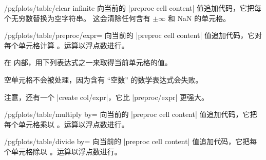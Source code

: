 \documentclass[a4paper,doc2]{ltxdoc}
\begin{document}
\begin{stylekey}{/pgfplots/table/clear infinite}
    向当前的 |preproc cell content| 值追加代码，它把每个无穷数替换为空字符串。
    这会清除任何含有 $\pm \infty$ 和 NaN 的单元格。
\end{stylekey}

\begin{stylekey}{/pgfplots/table/preproc/expr=}
    向当前的 |preproc cell content| 值追加代码，它对每个单元格计算
    。运算以浮点数进行。

    在  内部，用下列表达式之一来取得当前单元格的值。
\begin{codeexample}[]
\end{codeexample}

    空单元格不会被处理，因为含有 ``空数'' 的数学表达式会失败。

    注意，还有一个 |create col/expr|，它比 |preproc/expr| 更强大。
\end{stylekey}

\begin{stylekey}{/pgfplots/table/multiply by=}
    向当前的 |preproc cell content| 值追加代码，它把每个单元格乘以
    。运算以浮点数进行。
\end{stylekey}

\begin{stylekey}{/pgfplots/table/divide by=}
    向当前的 |preproc cell content| 值追加代码，它把每个单元格除以
    。运算以浮点数进行。
\end{stylekey}
\end{document}
